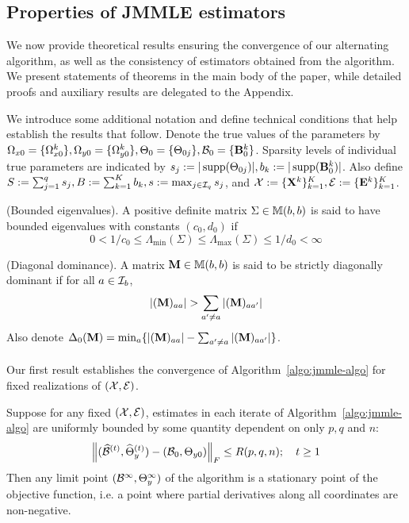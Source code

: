 \subsection{Properties of JMMLE estimators}
\label{sec:jmmle-theory}
We now provide theoretical results ensuring the convergence of our alternating algorithm, as well as the consistency of estimators obtained from the algorithm. We present statements of theorems in the main body of the paper, while detailed proofs and auxiliary results are delegated to the Appendix.

We introduce some additional notation and define technical conditions that help establish the results that follow. Denote the true values of the parameters by $\Omega_{x 0} = \{ \Omega_{x 0}^k \}, \Omega_{y 0} = \{ \Omega_{y 0}^k \}, \Theta_0 = \{ \Theta_{0 j} \}, {\cal{B}}_0 = \{ {\mathbf{B}}_0^k \}$. Sparsity levels of individual true parameters are indicated by $s_j := | \operatorname*{supp} (\Theta_{0j})|, b_k := | \operatorname*{supp}({\mathbf{B}}^k_0) |$. Also define $S := \sum_{j=1}^q s_j, B:= \sum_{k=1}^K b_k, s:= \max_{j \in {\cal{I}}_q } s_j$, and ${\cal{X}} := \{ {\mathbf{X}}^k \}_{k=1}^K, {\cal{E}} := \{ {\mathbf{E}}^k \}_{k=1}^K$.

\vspace{1em}
 (Bounded eigenvalues). A positive definite matrix $\Sigma \in {\mathbb{M}}(b,b)$ is said to have bounded eigenvalues with constants $(c_0, d_0)$ if
%
\[
0 < 1/c_0 \leq \Lambda_{\min} (\Sigma) \leq \Lambda_{\max} (\Sigma) \leq 1/d_0 < \infty
\]

 (Diagonal dominance). A matrix ${\mathbf{M}}  \in {\mathbb{M}}(b,b)$ is said to be strictly diagonally dominant if for all $a \in {\cal{I}}_b$,
%
$$
| ({\mathbf{M}})_{aa} | > \sum_{a' \neq a} |({\mathbf{M}})_{aa'} |
$$
%
Also denote $\Delta_0 ({\mathbf{M}}) = \min_a \{ | ({\mathbf{M}})_{aa} | - \sum_{a' \neq a} |({\mathbf{M}})_{aa'} | \}$.

\paragraph{}
Our first result establishes the convergence of Algorithm~\ref{algo:jmmle-algo} for fixed realizations of $({\cal{X}},{\cal{E}})$.

\begin{theorem}
\label{thm:algo-convergence}
Suppose for any fixed $({\cal{X}}, {\cal{E}})$, estimates in each iterate of Algorithm~\ref{algo:jmmle-algo} are uniformly bounded by some quantity dependent on only $p, q$ and $n$:
%
\begin{align}
\left\| (\widehat {{\cal{B}}}^{(t)}, \widehat \Theta_y^{(t)}) - ( {\cal{B}}_0, \Theta_{y 0}) \right\|_F
\leq R(p,q,n);
\quad t \geq 1
\end{align}
%
Then any limit point $({\cal{B}}^\infty, \Theta_y^\infty)$ of the algorithm is a stationary point of the objective function, i.e. a point where partial derivatives along all coordinates are non-negative.
\end{theorem}
%

